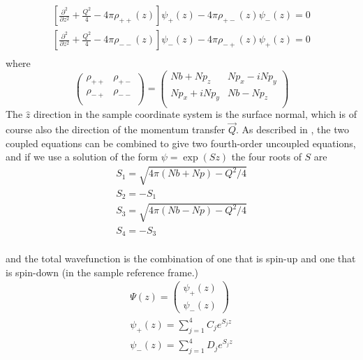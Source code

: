 \documentclass[%
 reprint,
 amsmath,
 amssymb,
 aps,
 prl,
 lengthcheck,%
]{revtex4-1}
\begin{document}
\begin{eqnarray}
    \left[ \frac{\partial^2}{\partial z^2} + \frac{Q^2}{4} - 4\pi\rho_{++}(z) \right ] \psi_{+}(z) 
    	- 4\pi\rho_{+-}(z) \psi_{-}(z) = 0 \nonumber \\
    \left[ \frac{\partial^2}{\partial z^2} + \frac{Q^2}{4} - 4\pi\rho_{--}(z) \right ] \psi_{-}(z) 
    	- 4\pi\rho_{-+}(z) \psi_{+}(z) = 0 \nonumber \\
\end{eqnarray}
where 
\begin{equation}
  \begin{pmatrix} 
    \rho_{++} & \rho_{+-} \\ 
    \rho_{-+} & \rho_{--} \\ 
  \end{pmatrix}
= \begin{pmatrix}
    Nb + Np_z & Np_x - iNp_y \\
    Np_x + iNp_y & Nb - Np_z \\
  \end{pmatrix}
\end{equation}
The $\hat z$ direction in the sample coordinate system is the surface normal, 
which is of course also the direction of the momentum transfer $\vec Q$.  
As described in \cite{PNRMajkrzakChapter}, the two coupled equations can be 
combined to give two fourth-order uncoupled equations, and if we use a 
solution of the form $\psi=\exp(Sz)$ the four roots of $S$ are
\begin{equation}
  \begin{array}{l}
  S_1 = \sqrt{4\pi(Nb + Np) - Q^2/4} \\
  S_2 = -S_1 \\
  S_3 = \sqrt{4\pi(Nb - Np) - Q^2/4} \\
  S_4 = -S_3 \\
  \end{array}
\end{equation}

and the total wavefunction is the combination of one that is spin-up and one
that is spin-down (in the sample reference frame.) 
\begin{equation}
  \begin{array}{l}
  \displaystyle \Psi(z) = \begin{pmatrix} \psi_{+}(z) \\ \psi_{-}(z) \end{pmatrix}\\
  \displaystyle \psi_{+}(z) = \sum_{j=1}^{4} C_j e^{S_j z} \\
  \displaystyle \psi_{-}(z) = \sum_{j=1}^{4} D_j e^{S_j z} \\
  \end{array}
\end{equation}
\end{document}
